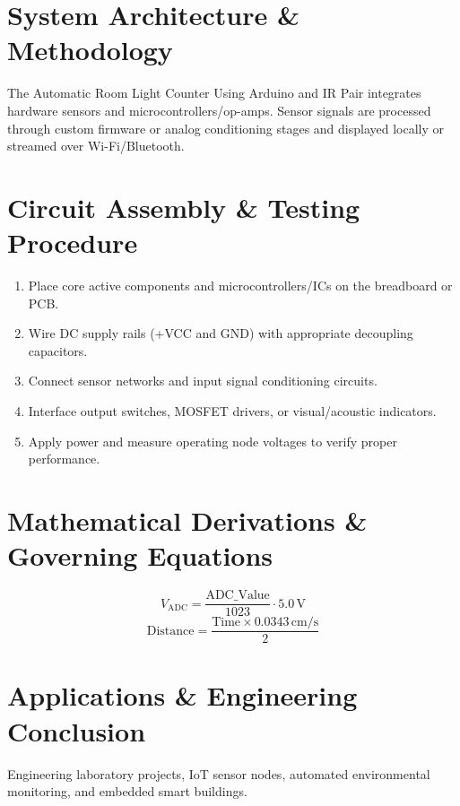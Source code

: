 \documentclass[11pt,a4paper]{article}
\begin{document}
\section{System Architecture \& Methodology}
The Automatic Room Light Counter Using Arduino and IR Pair integrates hardware sensors and microcontrollers/op-amps. Sensor signals are processed through custom firmware or analog conditioning stages and displayed locally or streamed over Wi-Fi/Bluetooth.

\section{Circuit Assembly \& Testing Procedure}
\begin{enumerate}
    \item Place core active components and microcontrollers/ICs on the breadboard or PCB.
    \item Wire DC supply rails (+VCC and GND) with appropriate decoupling capacitors.
    \item Connect sensor networks and input signal conditioning circuits.
    \item Interface output switches, MOSFET drivers, or visual/acoustic indicators.
    \item Apply power and measure operating node voltages to verify proper performance.
\end{enumerate}

\section{Mathematical Derivations \& Governing Equations}
\begin{equation}
V_{\text{ADC}} = \frac{\text{ADC\_Value}}{1023} \cdot 5.0\,\text{V}
\end{equation}
\begin{equation}
\text{Distance} = \frac{\text{Time} \times 0.0343\,\text{cm/s}}{2}
\end{equation}

\section{Applications \& Engineering Conclusion}
Engineering laboratory projects, IoT sensor nodes, automated environmental monitoring, and embedded smart buildings.
\end{document}
